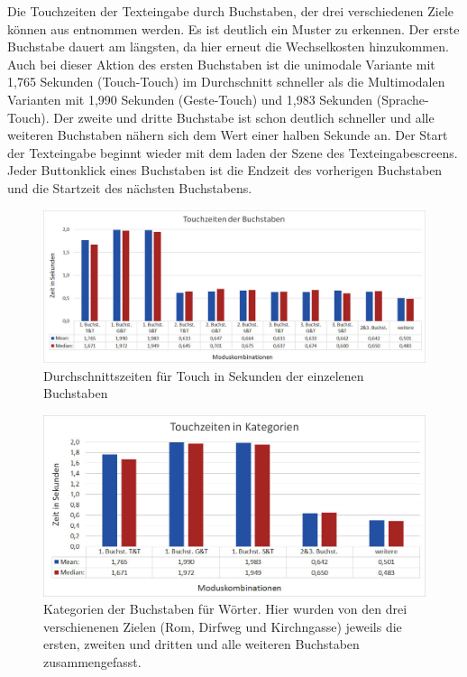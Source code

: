 Die Touchzeiten der Texteingabe durch Buchstaben, der drei verschiedenen Ziele können aus  entnommen werden. 
Es ist deutlich ein Muster zu erkennen. 
Der erste Buchstabe dauert am längsten, da hier erneut die Wechselkosten hinzukommen. 
Auch bei dieser Aktion des ersten Buchstaben ist die unimodale Variante mit 1,765 Sekunden (Touch-Touch) im Durchschnitt schneller als die Multimodalen Varianten mit 1,990 Sekunden (Geste-Touch) und 1,983 Sekunden (Sprache-Touch).
Der zweite und dritte Buchstabe ist schon deutlich schneller und alle weiteren Buchstaben nähern sich dem Wert einer halben Sekunde an. 
Der Start der Texteingabe beginnt wieder mit dem laden der Szene des Texteingabescreens. Jeder Buttonklick eines Buchstaben ist die Endzeit des vorherigen Buchstaben und die Startzeit des nächsten Buchstabens.
\begin{figure}[ht]
  \centering
  \includegraphics[width=1\textwidth]{img/TouchzeitenBuchstabenGesamt.jpg}
  \caption{Durchschnittszeiten für Touch in Sekunden der einzelenen Buchstaben}
  \label{fig:TouchzeitenB_Ges}
\end{figure}
\begin{figure}[ht]
  \centering
  \includegraphics[width=1\textwidth]{img/TouchzeitenKategorien.JPG}
  \caption[Kategorien der Buchstaben für Wörter.]{Kategorien der Buchstaben für Wörter. Hier wurden von den drei verschienenen Zielen (Rom, Dirfweg und Kirchngasse) jeweils die ersten, zweiten und dritten und alle weiteren Buchstaben zusammengefasst.}
  \label{fig:Kategorien}
\end{figure} 

